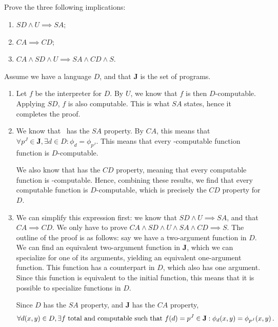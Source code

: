 \subsection{} %
Prove the three following implications:
\begin{enumerate}
	\item \(SD \land U \implies SA\);
	\item \(CA \implies CD\);
	\item \(CA \land SD \land U \implies SA \land CD \land S\).
\end{enumerate}

\begin{solution}
	Assume we have a language \(D\),
	and that \(\mathbf{J}\) is the set of \java{} programs.
	\begin{enumerate}
		\item Let \(f\) be the interpreter for \(D\).
		By \(U\), we know that \(f\) is then \(D\)-computable.
		Applying \(SD\), \(f\) is also computable.
		This is what \(SA\) states,
		hence it completes the proof.
		\item We know that \ has the \(SA\) property.
		By \(CA\), this means that
		\(\forall p^J \in \mathbf{J}, \exists d \in D :
		\phi_d = \phi_{p^J}\).
		This means that every \java-computable function function
		is \(D\)-computable.

		We also know that \java{} has the \(CD\) property,
		meaning that every computable function is \java-computable.
		Hence, combining these results,
		we find that every computable function is \(D\)-computable,
		which is precisely the \(CD\) property for \(D\).
		\item We can simplify this expression first:
		we know that \(SD \land U \implies SA\),
		and that \(CA \implies CD\).
		We only have to prove
		\(CA \land SD \land U \land SA \land CD \implies S\).
		The outline of the proof is as follows:
		say we have a two-argument function in \(D\).
		We can find an equivalent two-argument function
		in \(\mathbf{J}\),
		which we can specialize for one of its arguments,
		yielding an equivalent one-argument function.
		This function has a counterpart in \(D\),
		which also has one argument.
		Since this function is equivalent to the initial function,
		this means that it is possible to specialize functions in \(D\).

		Since \(D\) has the \(SA\) property,
		and \(\mathbf{J}\) has the \(CA\) property,
		\[
		\forall d(x, y) \in D, \exists f \textnormal{ total and computable such that } f(d) = p^J \in \mathbf{J}:
		\phi_d(x, y) = \phi_{p^J}(x, y)\,.
		\]


\end{enumerate}
\end{solution}
